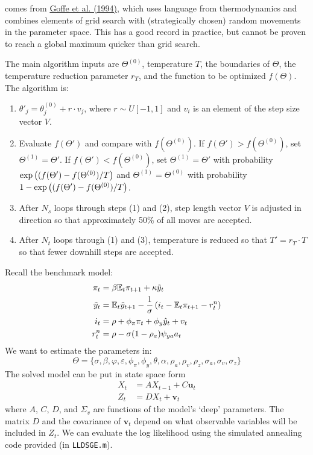 \documentclass[10pt]{article}
\begin{document}
\begin{definition}
	 comes from \href{https://www.sciencedirect.com/science/article/pii/0304407694900388}{Goffe et al. (1994)}, which uses language from thermodynamics and combines elements of grid search with (strategically chosen) random movements in the parameter space. This has a good record in practice, but cannot be proven to reach a global maximum quicker than grid search.
	
	The main algorithm inputs are $\Theta^{(0)}$, temperature $T$, the boundaries of $\Theta$, the temperature reduction parameter $r_T$, and the function to be optimized $f(\Theta)$. The algorithm is:
	\begin{enumerate}
		\item $\theta'_j = \theta_j^{(0)} + r\cdot v_j$, where $r \sim U[-1,1]$ and $v_i$ is an element of the step size vector $V$.
		\item Evaluate $f(\Theta')$ and compare with $f(\Theta^{(0)})$. If $f(\Theta') > f(\Theta^{(0)})$, set $\Theta^{(1)} = \Theta'$. If $f(\Theta') < f(\Theta^{(0)})$, set $\Theta^{(1)} = \Theta'$ with probability $\exp\left( (f(\Theta') - f(\Theta^{(0)}) / T\right)$ and $\Theta^{(1)} = \Theta^{(0)}$ with probability $1- \exp\left( (f(\Theta') - f(\Theta^{(0)}) / T\right)$.
		\item After $N_s$ loops through steps (1) and (2), step length vector $V$ is adjusted in direction so that approximately 50\% of all moves are accepted.
		\item After $N_t$ loops through (1) and (3), temperature is reduced so that $T' = r_T \cdot T$ so that fewer downhill steps are accepted.
	\end{enumerate}
\end{definition}

\begin{example}
	 Recall the benchmark model:
	\begin{align*}
		\pi_t &= \beta \mathbb{E}_t \pi_{t+1} + \kappa \tilde{y}_t \\
		\tilde{y}_t &= \mathbb{E}_t \tilde{y}_{t+1} - \frac{1}{\sigma} \left( i_t - \mathbb{E}_t \pi_{t+1} - r_t^n\right) \\
		i_t &= \rho + \phi_\pi \pi_t + \phi_y \hat{y}_t + v_t \\
		r_t^n &= \rho - \sigma(1-\rho_a)\psi_{ya}a_t
	\end{align*}
	We want to estimate the parameters in:
	\[
	\Theta = \{\sigma,\beta,\varphi,\varepsilon,\phi_\pi,\phi_y,\theta,\alpha,\rho_a,\rho_v,\rho_z,\sigma_a,\sigma_v,\sigma_z\}
	\]
	The solved model can be put in state space form \begin{align*} X_t &= A X_{t-1}+C\bm{u}_t \\ Z_t &= DX_t + \bm{v}_t\end{align*}where $A$, $C$, $D$, and $\Sigma_v$ are functions of the model's `deep' parameters. The matrix $D$ and the covariance of $\bm{v}_t$ depend on what observable variables will be included in $Z_t$. We can evaluate the log likelihood using the simulated annealing code provided (in \texttt{LLDSGE.m}).
\end{example}
\end{document}
